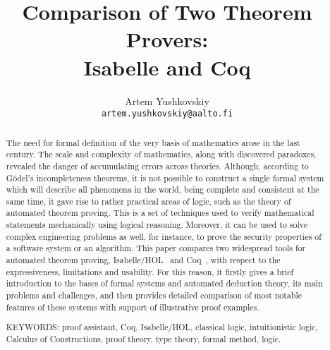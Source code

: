 \documentclass[article]{aaltoseries}
\begin{document}


\title{Comparison of Two Theorem Provers:\\ Isabelle and Coq}
\author{Artem Yushkovskiy \\
\textnormal{\texttt{artem.yushkovskiy@aalto.fi}}}


\maketitle



\begin{abstract}

The need for formal definition of the very basis of mathematics arose in the last century.
The scale and complexity of mathematics, along with discovered paradoxes, revealed the danger of accumulating errors across theories. Although, according to Gödel's incompleteness theorems, it is not possible to construct a single formal system which will describe all phenomena in the world, being complete and consistent at the same time, it gave rise to rather practical areas of logic, such as the theory of automated theorem proving. This is a set of techniques used to verify mathematical statements mechanically using logical reasoning. Moreover, it can be used to solve complex engineering problems as well, for instance, to prove the security properties of a software system or an algorithm.
This paper compares two widespread tools for automated theorem proving, Isabelle/HOL~\cite{tool_Isabelle} and Coq~\cite{tool_Coq}, with respect to the expressiveness, limitations and usability. For this reason, it firstly gives a brief introduction to the bases of formal systems and automated deduction theory, its main problems and challenges, and then provides detailed comparison of most notable features of these systems with support of illustrative proof examples.

\vspace{3mm}
\noindent KEYWORDS: proof assistant, Coq, Isabelle/HOL, classical logic, intuitionistic logic, Calculus of Constructions, proof theory, type theory, formal method, logic.
\end{abstract}

\end{document}
